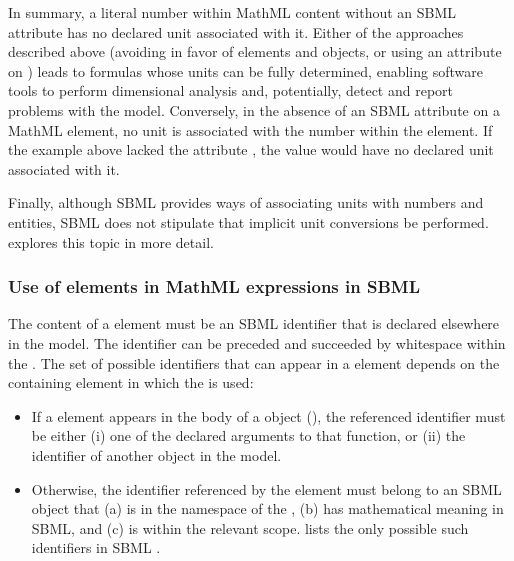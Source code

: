 In summary, a literal number within MathML content without an SBML
 attribute has no declared unit associated with it.
Either of the approaches described above (\ie avoiding 
in favor of  elements and \Parameter objects, or using
an  attribute on ) leads to formulas
whose units can be fully determined, enabling software tools to
perform dimensional analysis and, potentially, detect and report
problems with the model.  Conversely, in the absence of an SBML
 attribute on a MathML  element, no unit is
associated with the number within the  element.  If the
example above lacked the attribute , the value
 would have no declared unit associated with it.

Finally, although SBML provides ways of associating units with
numbers and entities, SBML does not stipulate that implicit unit
conversions be performed.
 explores this topic in
more detail.


\verone{\vspace*{0.5ex}}
\subsubsection{Use of  elements in MathML expressions in SBML}
\label{sec:ci-token}

The content of a  element must be an SBML identifier
that is declared elsewhere in the model.  The identifier can be
preceded and succeeded by whitespace within the .  The
set of possible identifiers that can appear in a 
element depends on the containing element in which the 
is used:
\begin{itemize}
  
\item If a  element appears in the  body of
  a \FunctionDefinition object
  (), the referenced
  identifier must be either (i) one of the declared arguments to
  that function, or (ii) the identifier of another
  \FunctionDefinition object in the model.
  
\item Otherwise, the identifier referenced by the 
  element must belong to 
  {an SBML object that (a) is in the  namespace of the \Model, (b) has mathematical meaning in SBML, and (c) is within the relevant scope.   lists the only possible such identifiers in SBML \thisLV.}

\end{itemize}

